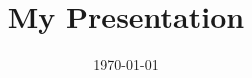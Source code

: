 \documentclass[handout, 11pt]{beamer}
\begin{document}
\title{My Presentation}
\author{}
\date{\today}
\begin{frame}
\titlepage
\label{title-frame}
\end{frame}
\end{document}
